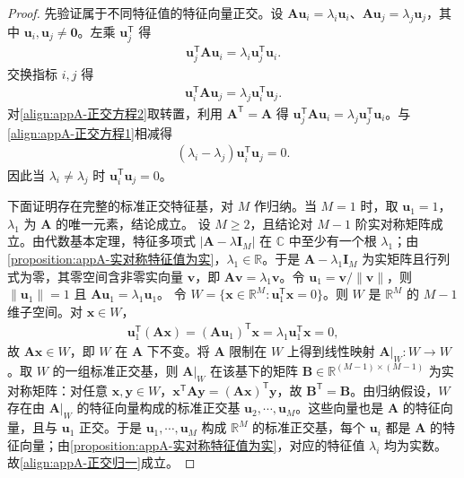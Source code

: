 \documentclass[../main.tex]{subfiles}
\begin{document}
\begin{proof}
先验证属于不同特征值的特征向量正交。设 $\bm{A}\bm{u}_i=\lambda_i\bm{u}_i$、$\bm{A}\bm{u}_j=\lambda_j\bm{u}_j$，其中 $\bm{u}_i,\bm{u}_j\neq\bm{0}$。左乘 $\bm{u}_j^{\mathsf{T}}$ 得
\begin{align}
 \bm{u}_j^{\mathsf{T}}\bm{A}\bm{u}_i=\lambda_i\bm{u}_j^{\mathsf{T}}\bm{u}_i.
 \label{align:appA-正交方程1}
\end{align}
交换指标 $i,j$ 得
\begin{align}
 \bm{u}_i^{\mathsf{T}}\bm{A}\bm{u}_j=\lambda_j\bm{u}_i^{\mathsf{T}}\bm{u}_j.
 \label{align:appA-正交方程2}
\end{align}
对\eqref{align:appA-正交方程2}取转置，利用 $\bm{A}^{\mathsf{T}}=\bm{A}$ 得 $\bm{u}_j^{\mathsf{T}}\bm{A}\bm{u}_i=\lambda_j\bm{u}_j^{\mathsf{T}}\bm{u}_i$。与\eqref{align:appA-正交方程1}相减得
\begin{align}
 (\lambda_i-\lambda_j)\bm{u}_i^{\mathsf{T}}\bm{u}_j=0.
 \label{align:appA-正交相减}
\end{align}
因此当 $\lambda_i\neq\lambda_j$ 时 $\bm{u}_i^{\mathsf{T}}\bm{u}_j=0$。

下面证明存在完整的标准正交特征基，对 $M$ 作归纳。当 $M=1$ 时，取 $\bm{u}_1=1$，$\lambda_1$ 为 $\bm{A}$ 的唯一元素，结论成立。
设 $M\geqslant2$，且结论对 $M-1$ 阶实对称矩阵成立。由代数基本定理，特征多项式 $|\bm{A}-\lambda\bm{I}_{M}|$ 在 $\mathbb{C}$ 中至少有一个根 $\lambda_1$；由\cref{proposition:appA-实对称特征值为实}，$\lambda_1\in\mathbb{R}$。于是 $\bm{A}-\lambda_1\bm{I}_{M}$ 为实矩阵且行列式为零，其零空间含非零实向量 $\bm{v}$，即 $\bm{A}\bm{v}=\lambda_1\bm{v}$。令 $\bm{u}_1=\bm{v}/\|\bm{v}\|$，则 $\|\bm{u}_1\|=1$ 且 $\bm{A}\bm{u}_1=\lambda_1\bm{u}_1$。
令 $W=\{\bm{x}\in\mathbb{R}^{M}:\bm{u}_1^{\mathsf{T}}\bm{x}=0\}$。则 $W$ 是 $\mathbb{R}^{M}$ 的 $M-1$ 维子空间。对 $\bm{x}\in W$，
\begin{align*}
 \bm{u}_1^{\mathsf{T}}(\bm{A}\bm{x})=(\bm{A}\bm{u}_1)^{\mathsf{T}}\bm{x}=\lambda_1\bm{u}_1^{\mathsf{T}}\bm{x}=0,
\end{align*}
故 $\bm{A}\bm{x}\in W$，即 $W$ 在 $\bm{A}$ 下不变。将 $\bm{A}$ 限制在 $W$ 上得到线性映射 $\bm{A}|_{W}:W\to W$。取 $W$ 的一组标准正交基，则 $\bm{A}|_{W}$ 在该基下的矩阵 $\bm{B}\in\mathbb{R}^{(M-1)\times(M-1)}$ 为实对称矩阵：对任意 $\bm{x},\bm{y}\in W$，$\bm{x}^{\mathsf{T}}\bm{A}\bm{y}=(\bm{A}\bm{x})^{\mathsf{T}}\bm{y}$，故 $\bm{B}^{\mathsf{T}}=\bm{B}$。由归纳假设，$W$ 存在由 $\bm{A}|_{W}$ 的特征向量构成的标准正交基 $\bm{u}_2,\cdots,\bm{u}_M$。这些向量也是 $\bm{A}$ 的特征向量，且与 $\bm{u}_1$ 正交。于是 $\bm{u}_1,\cdots,\bm{u}_M$ 构成 $\mathbb{R}^{M}$ 的标准正交基，每个 $\bm{u}_i$ 都是 $\bm{A}$ 的特征向量；由\cref{proposition:appA-实对称特征值为实}，对应的特征值 $\lambda_i$ 均为实数。故\eqref{align:appA-正交归一}成立。
\end{proof}
\end{document}
